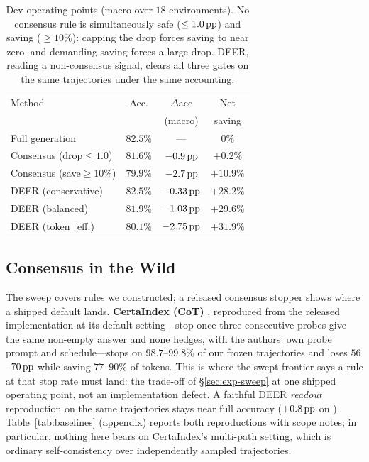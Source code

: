 \begin{table}[t]
  \centering\small
  \setlength{\tabcolsep}{4pt}
  \begin{tabular}{lccc}
    \toprule
    Method & Acc. & $\Delta$acc & Net \\
           &      & (macro)     & saving \\
    \midrule
    Full generation & $82.5\%$ & --- & $0\%$ \\
    \midrule
    Consensus (drop$\le1.0$)  & $81.6\%$ & $-0.9\,\text{pp}$  & $+0.2\%$ \\
    Consensus (save$\ge10\%$) & $79.9\%$ & $-2.7\,\text{pp}$  & $+10.9\%$ \\
    \midrule
    DEER (conservative)      & $82.5\%$ & $-0.33\,\text{pp}$ & $+28.2\%$ \\
    DEER (balanced)          & $81.9\%$ & $-1.03\,\text{pp}$ & $+29.6\%$ \\
    DEER (token\_eff.)       & $80.1\%$ & $-2.75\,\text{pp}$ & $+31.9\%$ \\
    \bottomrule
  \end{tabular}
  \caption{Dev operating points (macro over $18$ environments). No consensus rule
  is simultaneously safe ($\le1.0\,\text{pp}$) and saving ($\ge10\%$): capping the drop
  forces saving to near zero, and demanding saving forces a large drop. DEER,
  reading a non-consensus signal, clears all three gates on the same trajectories
  under the same accounting.}
  \label{tab:main}
\end{table}

\subsection{Consensus in the Wild}
\label{sec:exp-prior}
The sweep covers rules we constructed; a released consensus stopper shows where
a shipped default lands. \textbf{CertaIndex (CoT)} \citep{dynasor_certaindex},
reproduced from the released implementation at its default setting---stop once
three consecutive probes give the same non-empty answer and none hedges, with
the authors' own probe prompt and schedule---stops on $98.7$--$99.8\%$ of our
frozen trajectories and loses $56$--$70\,\text{pp}$ while saving $77$--$90\%$ of
tokens. This is where the swept frontier says a rule at that stop rate must
land: the trade-off of \S\ref{sec:exp-sweep} at one shipped operating point,
not an implementation defect. A faithful DEER \emph{readout} reproduction on
the same trajectories stays near full accuracy ($+0.8\,\text{pp}$ on \qweneight{}).
Table~\ref{tab:baselines} (appendix) reports both reproductions with scope
notes; in particular, nothing here bears on CertaIndex's multi-path setting,
which is ordinary self-consistency over independently sampled trajectories.

